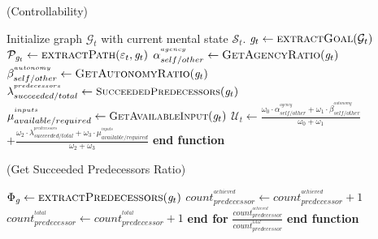 \documentclass[letterpaper]{article}
\begin{document}
\begin{algorithm}
	\caption{(Controllability)}
	\label{array-sum}
	\begin{algorithmic}[1]
			\Statex
			\State Initialize graph $\mathcal{G}_{t}$ with current mental state
			$\mathcal{S}_{t}$.
			\Statex
			\State $\mathit{g}_{t} \gets \Call{extractGoal}{\mathcal{G}_{t}}$ 
			\State $\mathcal{P}_{\mathit{g}_{t}} \gets \Call{extractPath}{\varepsilon_t,
			\mathit{g}_{t}}$
			\Statex
			\State $\alpha_{self/other}^{^{agency}} \gets
			\Call{GetAgencyRatio}{\mathit{g}_{t}}$ 
			\Statex
			\State $\beta_{self/other}^{^{autonomy}} \gets
			\Call{GetAutonomyRatio}{\mathit{g}_{t}}$
			\Statex
			\State $\lambda_{succeeded/total}^{^{predecessors}} \gets
			\Call{\small{SucceededPredecessors}}{\mathit{g}_{t}}$
			\Statex
			\State $\mu_{available/required}^{^{inputs}} \gets
			\Call{\small{GetAvailableInput}}{\mathit{g}_{t}}$
			\Statex
			\State $\mathcal{U}_{t} \gets
			\frac{\omega_{0}\cdot \alpha_{self/other}^{^{agency}} +
			\omega_{1}\cdot \beta_{self/other}^{^{autonomy}}}{\omega_{0} + \omega_{1}}$
			\Statex\\
			\qquad \qquad $+ \frac{\omega_{2}\cdot
			\lambda_{succeeded/total}^{^{predecessors}} + \omega_{3}\cdot
			\mu_{available/required}^{^{inputs}}}{\omega_{2} + \omega_{3}}$
			\Statex
				\State {}
			\Else
				\State {}
			\EndIf
		\EndFunction
		\State \textbf{end function}
	\end{algorithmic}
\end{algorithm}

\begin{algorithm}
	\caption{(Get Succeeded Predecessors Ratio)}
	\label{array-sum}
	\begin{algorithmic}[1]
			\Statex
			\State $\Phi_{\mathit{g}} \gets
			\Call{extractPredecessors}{\mathit{g}_t}$
			\Statex
					\State $count_{predecessor}^{^{achieved}} \gets
					count_{predecessor}^{^{achieved}} + 1$
				\EndIf
				\Statex
				\State $count_{predecessor}^{^{total}} \gets count_{predecessor}^{^{total}} + 1$
			\EndFor \State \textbf{end for}
			\Statex
			\State \Return
			$\frac{count_{predecessor}^{^{achieved}}}{count_{predecessor}^{^{total}}}$
		\EndFunction 
	\State \textbf{end function}
	\end{algorithmic}
\end{algorithm}
\end{document}

